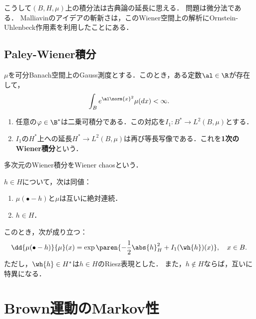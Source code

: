 \documentclass[uplatex,dvipdfmx]{jsreport}
\begin{document}
\begin{tcolorbox}[colframe=ForestGreen, colback=ForestGreen!10!white,breakable,colbacktitle=ForestGreen!40!white,coltitle=black,fonttitle=\bfseries\sffamily,
title=]
    こうして$(B,H,\mu)$上の積分法は古典論の延長に思える．
    問題は微分法である．
    Malliavinのアイデアの斬新さは，このWiener空間上の解析にOrnstein-Uhlenbeck作用素を利用したことにある．
\end{tcolorbox}

\subsection{Paley-Wiener積分}

\begin{theorem}[Fernique]
    $\mu$を可分Banach空間上のGauss測度とする．このとき，ある定数$\al\in\R$が存在して，
    \[\int_Be^{\al\norm{x}^2}\mu(dx)<\infty.\]
\end{theorem}

\begin{corollary}\mbox{}
    \begin{enumerate}
        \item 任意の$\varphi\in\B^*$は二乗可積分である．この対応を$I_1:B^*\to L^2(B,\mu)$とする．
        \item $I_1$の$H^*$上への延長$H^*\to L^2(B,\mu)$は再び等長写像である．これを\textbf{1次のWiener積分}という．
    \end{enumerate}
\end{corollary}
\begin{remarks}
    多次元のWiener積分をWiener chaosという．
\end{remarks}

\begin{theorem}[Gauss測度の平行移動]
    $h\in H$について，次は同値：
    \begin{enumerate}
        \item $\mu(\bullet-h)$と$\mu$は互いに絶対連続．
        \item $h\in H$．
    \end{enumerate}
    このとき，次が成り立つ：
    \[\dd{\mu(\bullet-h)}{\mu}(x)=\exp\paren{-\frac{1}{2}\abs{h}^2_H+I_1(\wh{h})(x)},\quad x\in B.\]
    ただし，$\wh{h}\in H^*$は$h\in H$のRiesz表現とした．
    また，$h\notin H$ならば，互いに特異になる．
\end{theorem}


\section{Brown運動のMarkov性}
\end{document}
